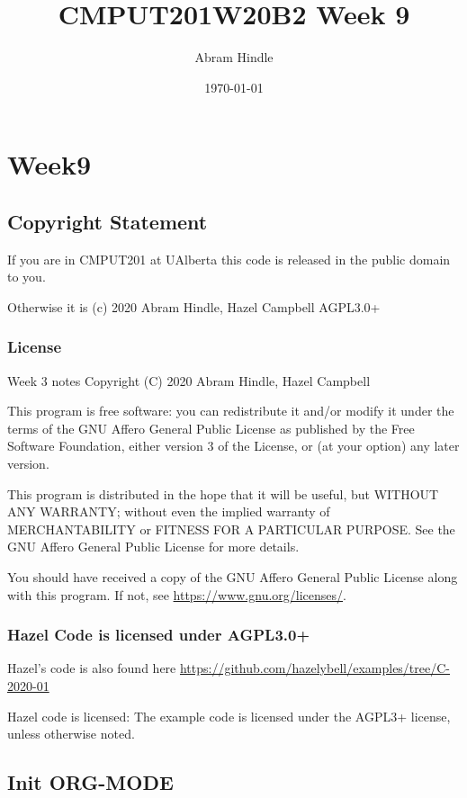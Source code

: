 \documentclass[11pt]{article}
\author{Abram Hindle}
\date{\today}
\title{CMPUT201W20B2 Week 9}
\begin{document}
\maketitle
\tableofcontents


\section{Week9}
\label{sec:orga425aa3}
\subsection{Copyright Statement}
\label{sec:org5bfc844}

If you are in CMPUT201 at UAlberta this code is released in the public
domain to you.

Otherwise it is (c) 2020 Abram Hindle, Hazel Campbell AGPL3.0+

\subsubsection{License}
\label{sec:org8c75d65}

Week 3 notes
Copyright (C) 2020 Abram Hindle, Hazel Campbell

This program is free software: you can redistribute it and/or modify
it under the terms of the GNU Affero General Public License as
published by the Free Software Foundation, either version 3 of the
License, or (at your option) any later version.

This program is distributed in the hope that it will be useful,
but WITHOUT ANY WARRANTY; without even the implied warranty of
MERCHANTABILITY or FITNESS FOR A PARTICULAR PURPOSE.  See the
GNU Affero General Public License for more details.

You should have received a copy of the GNU Affero General Public License
along with this program.  If not, see \url{https://www.gnu.org/licenses/}.


\subsubsection{Hazel Code is licensed under AGPL3.0+}
\label{sec:org3a4fca2}

Hazel's code is also found here
\url{https://github.com/hazelybell/examples/tree/C-2020-01}

Hazel code is licensed: The example code is licensed under the AGPL3+
license, unless otherwise noted.

\subsection{Init ORG-MODE}
\label{sec:orge88e681}
\end{document}
